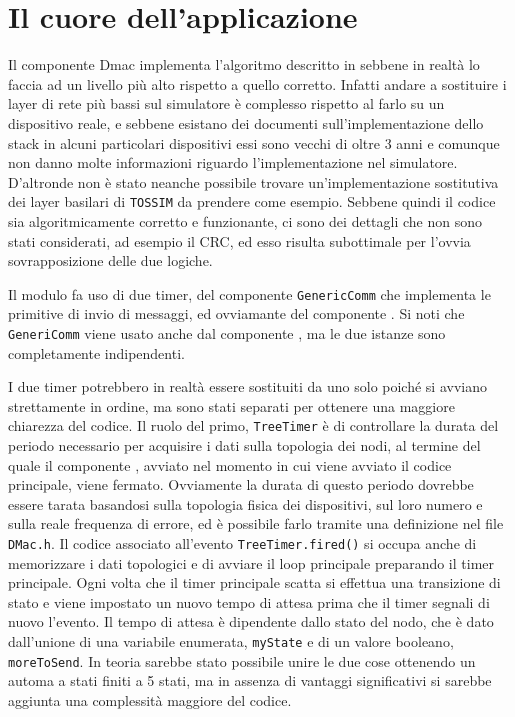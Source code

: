 \documentclass[twoside,11pt,a4paper,italian,openany]{book}
\newcommand{\tos}{\texttt{TOSSIM} }
\begin{document}
\section{Il cuore dell'applicazione}
Il componente Dmac implementa l'algoritmo descritto in \cite{DMAC} sebbene in realtà lo faccia 
ad un livello più alto rispetto a quello corretto. Infatti andare a sostituire i layer di rete 
più bassi sul simulatore è complesso rispetto al farlo su un dispositivo reale, 
e sebbene esistano dei documenti sull'implementazione dello stack in alcuni particolari dispositivi\cite{stackpdf} essi sono vecchi di oltre 3 anni e comunque non danno molte informazioni 
riguardo l'implementazione nel simulatore. 
D'altronde non è stato neanche possibile trovare un'implementazione sostitutiva dei layer 
basilari di \tos da prendere come esempio. 
Sebbene quindi il codice sia algoritmicamente corretto e funzionante,
ci sono dei dettagli che non sono stati considerati, ad esempio il CRC, ed esso risulta 
subottimale per l'ovvia sovrapposizione delle due logiche. 

Il modulo fa uso di due timer, del componente \texttt{GenericComm}  che implementa le 
primitive di invio di messaggi, ed ovviamante del componente \tree. 
Si noti che \texttt{GeneriComm} viene usato anche dal componente \tree, ma le due istanze sono completamente indipendenti.  

I due timer potrebbero in realtà essere sostituiti da uno solo poiché si avviano strettamente
in ordine, ma sono stati separati per ottenere una maggiore chiarezza del codice.
Il ruolo del primo, \texttt{TreeTimer} è di controllare la durata del periodo necessario per
acquisire i dati sulla topologia dei nodi, al termine del quale il componente \tree, avviato 
nel momento in cui viene avviato il codice principale, viene fermato.
Ovviamente la durata di questo periodo dovrebbe essere tarata basandosi sulla topologia fisica 
dei dispositivi, sul loro numero e sulla reale frequenza di errore, ed è possibile farlo 
tramite una definizione nel file \texttt{DMac.h}.
Il codice associato all'evento \texttt{TreeTimer.fired()} si occupa anche di memorizzare 
i dati topologici e di avviare il loop principale preparando il timer principale. 
Ogni volta che il timer principale scatta si effettua una transizione di stato e viene 
impostato un nuovo tempo di attesa prima che il timer segnali di nuovo l'evento. 
Il tempo di attesa è dipendente dallo stato del nodo, che è dato dall'unione di una variabile 
enumerata, \texttt{myState} e di un valore booleano, \texttt{moreToSend}. 
In teoria sarebbe stato possibile unire le due cose ottenendo un automa a stati finiti a 
5 stati, ma in assenza di vantaggi significativi si sarebbe aggiunta una complessità maggiore 
del codice. 
\end{document}
